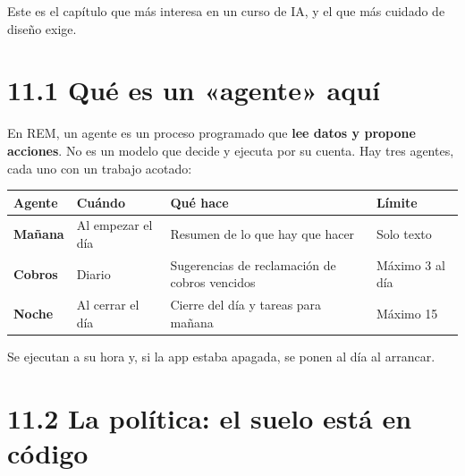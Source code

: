 Este es el capítulo que más interesa en un curso de IA, y el que más cuidado de diseño exige.

\section{11.1 Qué es un «agente» aquí}\label{quuxe9-es-un-agente-aquuxed}

En REM, un agente es un proceso programado que \textbf{lee datos y propone acciones}. No es un modelo que decide y ejecuta por su cuenta. Hay tres agentes, cada uno con un trabajo acotado:

{\def\LTcaptype{none} %
\begin{longtable}[]{@{}
  >{\raggedright\arraybackslash}p{}
  >{\raggedright\arraybackslash}p{}
  >{\raggedright\arraybackslash}p{}
  >{\raggedright\arraybackslash}p{}@{}}
\toprule\noalign{}
\begin{minipage}[b]{\linewidth}\raggedright
Agente
\end{minipage} & \begin{minipage}[b]{\linewidth}\raggedright
Cuándo
\end{minipage} & \begin{minipage}[b]{\linewidth}\raggedright
Qué hace
\end{minipage} & \begin{minipage}[b]{\linewidth}\raggedright
Límite
\end{minipage} \\
\midrule\noalign{}
\endhead
\bottomrule\noalign{}
\endlastfoot
\textbf{Mañana} & Al empezar el día & Resumen de lo que hay que hacer & Solo texto \\
\textbf{Cobros} & Diario & Sugerencias de reclamación de cobros vencidos & Máximo 3 al día \\
\textbf{Noche} & Al cerrar el día & Cierre del día y tareas para mañana & Máximo 15 \\
\end{longtable}
}

Se ejecutan a su hora y, si la app estaba apagada, se ponen al día al arrancar.

\section{11.2 La política: el suelo está en código}\label{la-poluxedtica-el-suelo-estuxe1-en-cuxf3digo}

